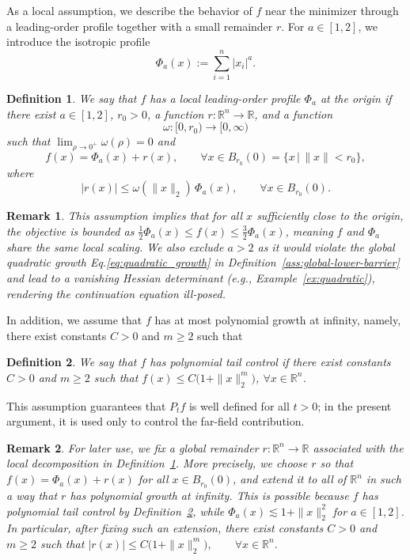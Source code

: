 \documentclass{article}
\newtheorem{definition}[definition]{Definition}
\newtheorem{remark}[remark]{Remark}
\begin{document}
As a local assumption, we describe the behavior of $f$ near the minimizer through a leading-order profile together with a small remainder $r$. For $a\in[1,2]$, we introduce the isotropic profile
$$\Phi_a(x):=\sum_{i=1}^n |x_i|^a.$$

\begin{definition}
\label{ass:leading-profile}
We say that $f$ has a local leading-order profile $\Phi_a$ at the origin if there exist $a\in[1,2]$, $r_0>0$, a function $r:\mathbb R^n\to\mathbb R$, and a function
$$\omega:[0,r_0)\to[0,\infty)$$
such that $\lim_{\rho\to0^+}\omega(\rho)=0$ and
$$f(x)=\Phi_a(x)+r(x),\qquad \forall x\in B_{r_0}(0)=\{x\,|\,\|x\|<r_0\},$$
where
$$|r(x)|\le \omega(\|x\|_2)\,\Phi_a(x),\qquad \forall x\in B_{r_0}(0).$$
\end{definition}
\begin{remark}
This assumption implies that for all $x$ sufficiently close to the origin, the objective is bounded as $\frac{1}{2}\Phi_a(x) \le f(x) \le \frac{3}{2}\Phi_a(x)$, meaning $f$ and $\Phi_a$ share the same local scaling. We also exclude $a > 2$ as it would violate the global quadratic growth Eq.\eqref{eq:quadratic_growth} in Definition~\ref{ass:global-lower-barrier} and lead to a vanishing Hessian determinant (e.g., Example~\ref{ex:quadratic}), rendering the continuation equation ill-posed.
\end{remark}
In addition, we assume that $f$ has at most polynomial growth at infinity, namely, there exist constants $C>0$ and $m\ge2$ such that
\begin{definition}\label{ass:tail-control} 
We say that $f$ has polynomial tail control if there exist constants $C>0$ and $m\ge2$ such that $f(x)\le C\bigl(1+\|x\|_2^m\bigr)$, $\forall x\in\mathbb R^n$.
\end{definition}
This assumption guarantees that $P_t f$ is well defined for all $t>0$; in the present argument, it is used only to control the far-field contribution.
\begin{remark}\label{rem:r-extension}
For later use, we fix a global remainder $r:\mathbb R^n\to\mathbb R$ associated with the local decomposition in Definition~\ref{ass:leading-profile}. More precisely, we choose $r$ so that $f(x)=\Phi_a(x)+r(x)$ for all $x\in B_{r_0}(0)$, and extend it to all of $\mathbb R^n$ in such a way that $r$ has polynomial growth at infinity. This is possible because $f$ has polynomial tail control by Definition~\ref{ass:tail-control}, while $\Phi_a(x)\lesssim 1+\|x\|_2^2$ for $a\in[1,2]$. In particular, after fixing such an extension, there exist constants $C>0$ and $m\ge2$ such that $|r(x)|\le C\bigl(1+\|x\|_2^m\bigr),\qquad \forall x\in\mathbb R^n.$
\end{remark}
\end{document}
